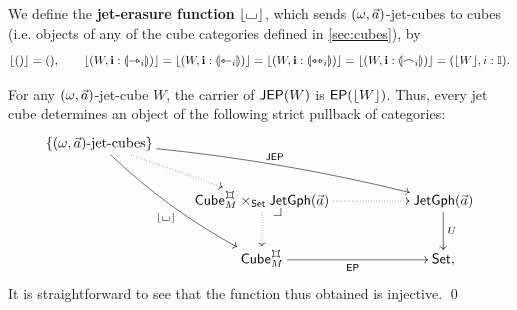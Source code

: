 \documentclass[a4paper]{memoir}
\begin{document}
\begin{definition} \label{def:jet-cube-erasure}
	We define the \textbf{jet-erasure function} $\mathopen{}\left\lfloor {\llcorner\hspace{-.4ex}\lrcorner} \right\rfloor\mathclose{}$, which sends $(\omega, \vec a)$-jet-cubes to cubes (i.e. objects of any of the cube categories defined in \cref{sec:cubes}), by
	\[
		\mathopen{}\left\lfloor () \right\rfloor\mathclose{} = (),
		\qquad
		\mathopen{}\left\lfloor (W, \mathbf{i} : {\llparenthesis \rightarrowtriangle_i \rrparenthesis}) \right\rfloor\mathclose{} =
		\mathopen{}\left\lfloor (W, \mathbf{i} : {\llparenthesis \leftarrowtriangle_i \rrparenthesis}) \right\rfloor\mathclose{} =
		\mathopen{}\left\lfloor (W, \mathbf{i} : {\llparenthesis \leftrightarrowtriangle_i \rrparenthesis}) \right\rfloor\mathclose{} =
		\mathopen{}\left\lfloor (W, \mathbf{i} : {\llparenthesis \frown_i \rrparenthesis}) \right\rfloor\mathclose{} =
		(\mathopen{}\left\lfloor W \right\rfloor\mathclose{}, i : {\mathbb I}).
	\]
\end{definition}
\begin{corollary} \label{thm:jet-cube-pullback}
	For any $(\omega, \vec a)$-jet-cube $W$, the carrier of $\mathsf{JEP}(W)$ is $\mathsf{EP}(\mathopen{}\left\lfloor W \right\rfloor\mathclose{})$.
	Thus, every jet cube determines an object of the following strict pullback of categories:
	\[
			\xymatrix{
				\accol{\text{$(\myorix, \vec a)$-jet-cubes}}
					\ar@/^/[rrrd]^{\JEP}
					\ar@/_/[rdd]_{\erasejc{\loch}}
					\ar@{.>}[rd]
				\\
				&
				\cubecat^\mycubex_M \times_\Set \jetgph{\vec a}
					\ar@{.>}[rr]
					\ar@{.>}[d]
					\xydrcorner
				&&
				\jetgph{\vec a}
					\ar[d]^U
				\\
				&
				\cubecat^\mycubex_M
					\ar[rr]_{\EP}
				&&
				\Set,
			}
	\]
	It is straightforward to see that the function thus obtained is injective. \qed
\end{corollary}
\end{document}
